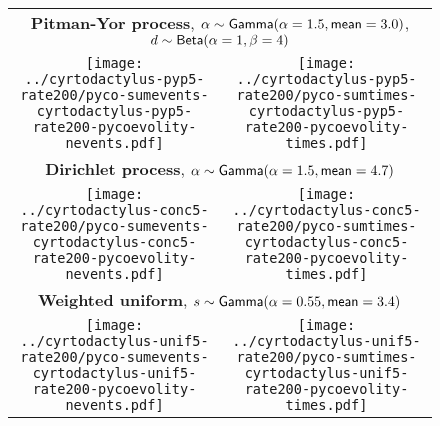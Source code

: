\documentclass[border=10pt,varwidth=30cm]{standalone}
\newcommand{\concentration}{\ensuremath{\alpha}\xspace}
\newcommand{\discount}{\ensuremath{d}\xspace}
\newcommand{\splitweight}{\ensuremath{s}\xspace}
\newcommand{\distgamma}{\ensuremath{\textrm{\sffamily Gamma}}\xspace}
\newcommand{\distbeta}{\ensuremath{\textrm{\sffamily Beta}}\xspace}
\newcommand{\dgamma}[2]{\ensuremath{\distgamma(\alpha = #1, \textrm{\sffamily mean} = #2)}}
\newcommand{\dbeta}[2]{\ensuremath{\distbeta(\alpha = #1, \beta = #2)}}
\begin{document}
\begin{figure}
    \setlength{\tabcolsep}{3pt} %
    \centering
    \begin{tabular}{@{}cc@{}}
        \multicolumn{2}{c}{\LARGE \textbf{Pitman-Yor process}, $\concentration \sim \dgamma{1.5}{3.0}$, $\discount \sim \dbeta{1}{4}$} \\[0.7ex]
        \texttt{[image: ../cyrtodactylus-pyp5-rate200/pyco-sumevents-cyrtodactylus-pyp5-rate200-pycoevolity-nevents.pdf]}
        &
        \texttt{[image: ../cyrtodactylus-pyp5-rate200/pyco-sumtimes-cyrtodactylus-pyp5-rate200-pycoevolity-times.pdf]} \\[1ex]
        \multicolumn{2}{c}{\LARGE \textbf{Dirichlet process}, $\concentration \sim \dgamma{1.5}{4.7}$} \\[0.7ex]
        \texttt{[image: ../cyrtodactylus-conc5-rate200/pyco-sumevents-cyrtodactylus-conc5-rate200-pycoevolity-nevents.pdf]}
        &
        \texttt{[image: ../cyrtodactylus-conc5-rate200/pyco-sumtimes-cyrtodactylus-conc5-rate200-pycoevolity-times.pdf]} \\[1ex]
        \multicolumn{2}{c}{\LARGE \textbf{Weighted uniform}, $\splitweight \sim \dgamma{0.55}{3.4}$} \\[0.7ex]
        \texttt{[image: ../cyrtodactylus-unif5-rate200/pyco-sumevents-cyrtodactylus-unif5-rate200-pycoevolity-nevents.pdf]}
        &
        \texttt{[image: ../cyrtodactylus-unif5-rate200/pyco-sumtimes-cyrtodactylus-unif5-rate200-pycoevolity-times.pdf]} \\
    \end{tabular}
\end{figure}
\end{document}

